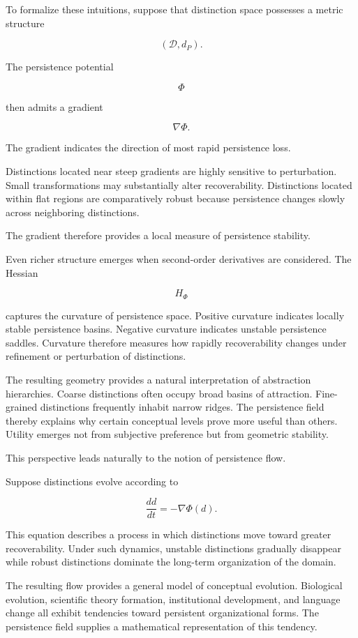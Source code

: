 \documentclass[12pt,oneside]{article}
\theoremstyle{definition}
\begin{document}
To formalize these intuitions, suppose that distinction space possesses a metric structure

\[
(\mathcal D,d_P).
\]

The persistence potential

\[
\Phi
\]

then admits a gradient

\[
\nabla \Phi.
\]

The gradient indicates the direction of most rapid persistence loss.

Distinctions located near steep gradients are highly sensitive to perturbation. Small transformations may substantially alter recoverability. Distinctions located within flat regions are comparatively robust because persistence changes slowly across neighboring distinctions.

The gradient therefore provides a local measure of persistence stability.

Even richer structure emerges when second-order derivatives are considered. The Hessian

\[
H_\Phi
\]

captures the curvature of persistence space. Positive curvature indicates locally stable persistence basins. Negative curvature indicates unstable persistence saddles. Curvature therefore measures how rapidly recoverability changes under refinement or perturbation of distinctions.

The resulting geometry provides a natural interpretation of abstraction hierarchies. Coarse distinctions often occupy broad basins of attraction. Fine-grained distinctions frequently inhabit narrow ridges. The persistence field thereby explains why certain conceptual levels prove more useful than others. Utility emerges not from subjective preference but from geometric stability.

This perspective leads naturally to the notion of persistence flow.

Suppose distinctions evolve according to

\[
\frac{dd}{dt}
=
-
\nabla \Phi(d).
\]

This equation describes a process in which distinctions move toward greater recoverability. Under such dynamics, unstable distinctions gradually disappear while robust distinctions dominate the long-term organization of the domain.

The resulting flow provides a general model of conceptual evolution. Biological evolution, scientific theory formation, institutional development, and language change all exhibit tendencies toward persistent organizational forms. The persistence field supplies a mathematical representation of this tendency.
\end{document}
